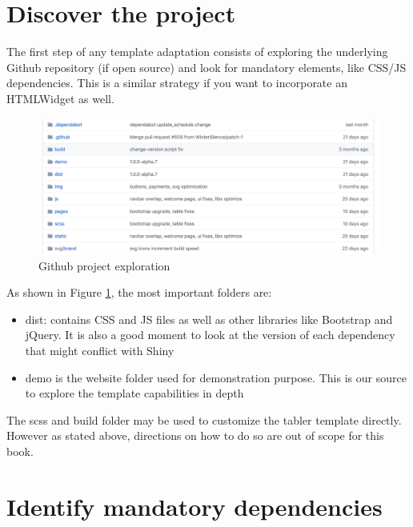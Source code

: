 \documentclass[
]{book}
\providecommand{\tightlist}{%
  \setlength{\itemsep}{0pt}\setlength{\parskip}{0pt}}
\begin{document}
\hypertarget{discover-the-project}{%
\section{Discover the project}\label{discover-the-project}}

The first step of any template adaptation consists of exploring the underlying Github repository (if open source) and look for mandatory elements, like CSS/JS dependencies. This is a similar strategy if you want to incorporate an HTMLWidget as well.

\begin{figure}
\includegraphics[width=32.03in]{images/practice/tabler-github} \caption{Github project exploration}\label{fig:tabler-github}
\end{figure}

As shown in Figure \ref{fig:tabler-github}, the most important folders are:

\begin{itemize}
\tightlist
\item
  dist: contains CSS and JS files as well as other libraries like Bootstrap and jQuery. It is also a good moment to look at the version of each dependency that might conflict with Shiny
\item
  demo is the website folder used for demonstration purpose. This is our source to explore the template capabilities in depth
\end{itemize}

The scss and build folder may be used to customize the tabler template directly. However as stated above, directions on how to do so are out of scope for this book.

\hypertarget{identify-mandatory-dependencies}{%
\section{Identify mandatory dependencies}\label{identify-mandatory-dependencies}}
\end{document}
